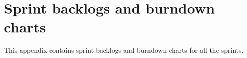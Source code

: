 \chapter{Sprint backlogs and burndown charts}
This appendix contains sprint backlogs and burndown charts for all the sprints.

